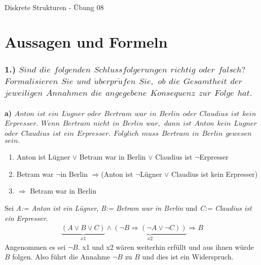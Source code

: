 \documentclass[titlepage]{article}
\newcommand{\1}{\mathbb{1}}
\newcommand{\0}{\mathbb{0}}
\begin{document}
	
	\begin{center}
		\hrulefill\\
		\begin{center}
			\LARGE Diskrete Strukturen - Übung 08 \normalsize\\
		\end{center}
		\hrulefill
		\date{\today}
	\end{center}
	
	\part*{Aussagen und Formeln}
	\section*{1.) \textit{$Sind$ $die$ $folgenden$ $Schlussfolgerungen$ $richtig$ $oder$ $falsch?$ $Formalisieren$ $Sie$ $und$ $\ddot uberpr\ddot ufen$ $Sie,$ $ob$ $die$ $Gesamtheit$ $der$ $jeweiligen$ $Annahmen$ $die$ $angegebene$ $Konsequenz$ $zur$ $Folge$ $hat.$}}
		\subsection*{a) \textit{$Anton$ $ist$ $ein$ $L\ddot ugner$ $oder$ $Bertram$ $war$ $in$ $Berlin$ $oder$ $Claudius$ $ist$ $kein$ $Erpresser.$ $Wenn$ $Bertram$ $nicht$ $in$ $Berlin$ $war,$ $dann$ $ist$ $Anton$ $kein$ $L\ddot ugner$ $oder$ $Claudius$ $ist$ $ein$ $Erpresser.$ $Folglich$ $muss$ $Bertram$ $in$ $Berlin$ $gewesen$ $sein.$}}
			\begin{enumerate}
				\item Anton ist Lügner $\vee$ Betram war in Berlin $\vee$ Claudius ist $\neg$Erpresser
				\item Betram war $\neg$in Berlin $\Rightarrow$(Anton ist $\neg$Lügner $\vee$ Claudius ist kein Erpresser)
				\item $\Longrightarrow$ Betram war in Berlin
			\end{enumerate}
		Sei \textit{A:= Anton ist ein Lügner}, \textit{B:= Betram war in Berlin} und \textit{C:= Claudius ist ein Erpresser}.
			\begin{align*}
				\underbrace{(A\vee B\vee C)}_{x1}\wedge\underbrace{(\neg B\Rightarrow(\neg A\vee\neg C))}_{x2}\Rightarrow B
			\end{align*}
		Angenommen es sei $\neg B$. x1 und x2 wären weiterhin erfüllt und aus ihnen würde $B$ folgen. Also führt die Annahme $\neg B$ zu $B$ und dies ist ein Widerspruch. \textcolor{red}{\lightning}
\end{document}
